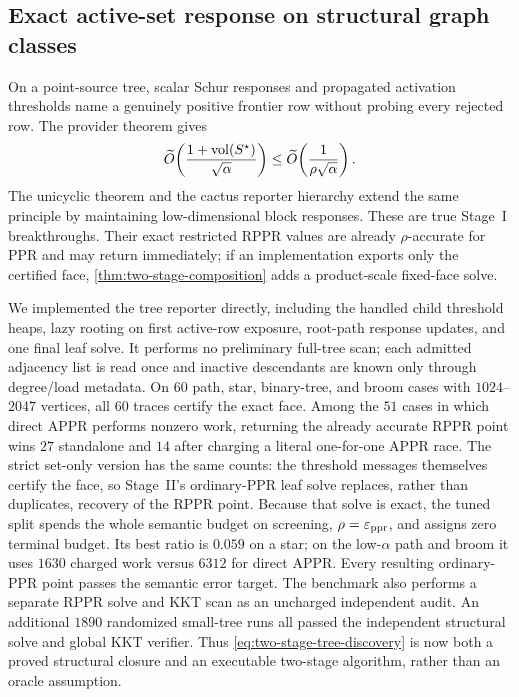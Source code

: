 \subsection{Exact active-set response on structural graph classes}

On a point-source tree, scalar Schur responses and propagated activation
thresholds name a genuinely positive frontier row without probing every
rejected row.  The provider theorem
 gives
\begin{equation}
 \widetilde O\!\left(
  \frac{1+\operatorname{vol}(S^\star)}{\sqrt\alpha}
 \right)
 \leq
 \widetilde O\!\left(\frac1{\rho\sqrt\alpha}\right).
 \label{eq:two-stage-tree-discovery}
\end{equation}
The unicyclic theorem and the cactus reporter hierarchy extend the same
principle by maintaining low-dimensional block responses.  These are true
Stage~I breakthroughs.  Their exact restricted RPPR values are already
$\rho$-accurate for PPR and may return immediately; if an implementation
exports only the certified face, \cref{thm:two-stage-composition} adds a
product-scale fixed-face solve.

We implemented the tree reporter directly, including the handled child
threshold heaps, lazy rooting on first active-row exposure, root-path response
updates, and one final leaf solve.  It performs no preliminary full-tree scan;
each admitted adjacency list is read once and inactive descendants are known
only through degree/load metadata.  On $60$ path, star, binary-tree, and broom cases
with $1024$--$2047$ vertices, all $60$ traces certify the exact face.  Among
the $51$ cases in which direct APPR performs nonzero work, returning the
already accurate RPPR point wins $27$ standalone and $14$ after charging a
literal one-for-one APPR race.  The strict set-only version has the same
counts: the threshold messages themselves certify the face, so Stage~II's
ordinary-PPR leaf solve replaces, rather than duplicates, recovery of the
RPPR point.  Because that solve is exact, the tuned split spends the whole
semantic budget on screening, $\rho=\varepsilon_{\mathrm{ppr}}$, and assigns zero terminal
budget.  Its best ratio is $0.059$ on a star; on the low-$\alpha$ path and
broom it uses $1630$ charged work versus $6312$ for direct APPR.  Every
resulting ordinary-PPR point passes the semantic error target.  The benchmark
also performs a separate RPPR solve and KKT scan as an uncharged independent
audit.  An additional $1890$ randomized small-tree runs all passed the
independent structural solve and global KKT verifier.  Thus
\cref{eq:two-stage-tree-discovery} is now both a proved structural closure and
an executable two-stage algorithm, rather than an oracle assumption.

